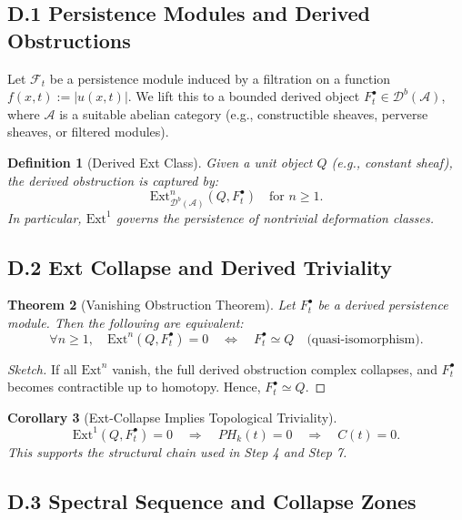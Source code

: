 \documentclass[11pt]{article}
\newtheorem{theorem}{Theorem}[section]
\newtheorem{definition}[theorem]{Definition}
\newtheorem{corollary}[theorem]{Corollary}
\begin{document}
\subsection*{D.1 Persistence Modules and Derived Obstructions}

Let $\mathcal{F}_t$ be a persistence module induced by a filtration on a function $f(x,t) := |u(x,t)|$.  
We lift this to a bounded derived object $F_t^\bullet \in \mathcal{D}^b(\mathcal{A})$, where $\mathcal{A}$ is a suitable abelian category (e.g., constructible sheaves, perverse sheaves, or filtered modules).

\begin{definition}[Derived Ext Class]
Given a unit object $Q$ (e.g., constant sheaf), the derived obstruction is captured by:
\[
\mathrm{Ext}^n_{\mathcal{D}^b(\mathcal{A})}(Q, F^\bullet_t) \quad \text{for } n \geq 1.
\]
In particular, $\mathrm{Ext}^1$ governs the persistence of nontrivial deformation classes.
\end{definition}

\subsection*{D.2 Ext Collapse and Derived Triviality}

\begin{theorem}[Vanishing Obstruction Theorem]
Let $F^\bullet_t$ be a derived persistence module. Then the following are equivalent:
\[
\forall n \geq 1,\quad \mathrm{Ext}^n(Q, F^\bullet_t) = 0
\quad \Longleftrightarrow \quad
F^\bullet_t \simeq Q \quad \text{(quasi-isomorphism)}.
\]
\end{theorem}

\begin{proof}[Sketch]
If all $\mathrm{Ext}^n$ vanish, the full derived obstruction complex collapses, and $F^\bullet_t$ becomes contractible up to homotopy. Hence, $F^\bullet_t \simeq Q$.
\end{proof}

\begin{corollary}[Ext-Collapse Implies Topological Triviality]
\[
\mathrm{Ext}^1(Q, F^\bullet_t) = 0 \quad \Rightarrow \quad PH_k(t) = 0 \quad \Rightarrow \quad C(t) = 0.
\]
This supports the structural chain used in Step 4 and Step 7.
\end{corollary}

\subsection*{D.3 Spectral Sequence and Collapse Zones}
\end{document}
